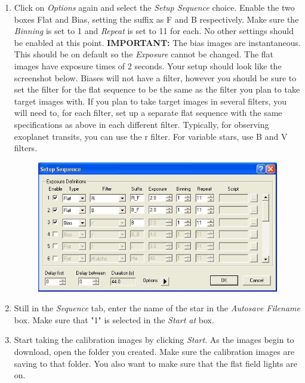 \documentclass[11pt]{report}
\begin{document}
\begin{enumerate}
\item Click on \emph{Options} again and select the \emph{Setup Sequence} choice. Enable the two boxes Flat and Bias, setting the suffix as F and B respectively. Make sure the \emph{Binning} is set to 1 and \emph{Repeat} is set to 11 for each. No other settings should be enabled at this point. {\bf IMPORTANT:} The bias images are instantaneous. This should be on default so the \emph{Exposure} cannot be changed. The flat images have exposure times of 2 seconds. Your setup should look like the screenshot below. Biases will not have a filter, however you should be sure to set the filter for the flat sequence to be the same as the filter you plan to take target images with. If you plan to take target images in several filters, you will need to, for each filter, set up a separate flat sequence with the same specifications as above in each different filter. Typically, for observing exoplanet transits, you can use the r filter. For variable stars, use B and V filters.

\begin{figure}[!h]
\begin{center}
\includegraphics[totalheight=.2\textheight]{Screenshot.jpg}
\end{center}
\end{figure}

\item Still in the \emph{Sequence} tab, enter the name of the star in the \emph{Autosave Filename} box. Make sure that "1" is selected in the \emph{Start at} box. 
\item Start taking the calibration images by clicking \emph{Start}. As the images begin to download, open the folder you created. Make sure the calibration images are saving to that folder. You also want to make sure that the flat field lights are on.
\end{enumerate}
\end{document}
